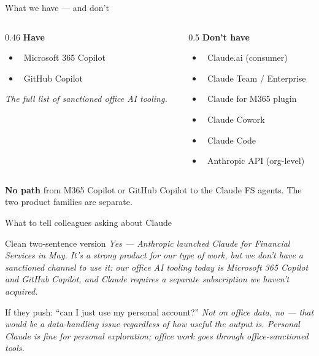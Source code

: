 \documentclass[11pt,aspectratio=169]{beamer}
\newcommand{\good}{\textcolor{successgreen}{\checkmark}}
\newcommand{\bad}{\textcolor{warningred}{\textbf{\texttimes}}}
\newcommand{\hl}[1]{\textbf{\textcolor{accentpurple}{#1}}}
\begin{document}
\begin{frame}{What we have --- and don't}
  \begin{columns}[T,onlytextwidth]
    \begin{column}{0.46\textwidth}
      \textbf{Have} \medskip
      \begin{itemize}
        \item \good\ Microsoft 365 Copilot
        \item \good\ GitHub Copilot
      \end{itemize}
      \medskip
      \footnotesize\textit{The full list of sanctioned office AI tooling.}
    \end{column}
    \begin{column}{0.5\textwidth}
      \textbf{Don't have} \medskip
      \begin{itemize}
        \footnotesize
        \item \bad\ Claude.ai (consumer)
        \item \bad\ Claude Team / Enterprise
        \item \bad\ Claude for M365 plugin
        \item \bad\ Claude Cowork
        \item \bad\ Claude Code
        \item \bad\ Anthropic API (org-level)
      \end{itemize}
    \end{column}
  \end{columns}
  \vfill
  \hl{No path} from M365 Copilot or GitHub Copilot to the Claude FS agents. The two product families are separate.
\end{frame}

\begin{frame}{What to tell colleagues asking about Claude}
  \begin{exampleblock}{Clean two-sentence version}
    \textit{Yes --- Anthropic launched Claude for Financial Services in May. It's a strong product for our type of work, but we don't have a sanctioned channel to use it: our office AI tooling today is Microsoft 365 Copilot and GitHub Copilot, and Claude requires a separate subscription we haven't acquired.}
  \end{exampleblock}

  \vfill
  \begin{block}{If they push: ``can I just use my personal account?''}
    \textit{Not on office data, no --- that would be a data-handling issue regardless of how useful the output is. Personal Claude is fine for personal exploration; office work goes through office-sanctioned tools.}
  \end{block}
\end{frame}
\end{document}
